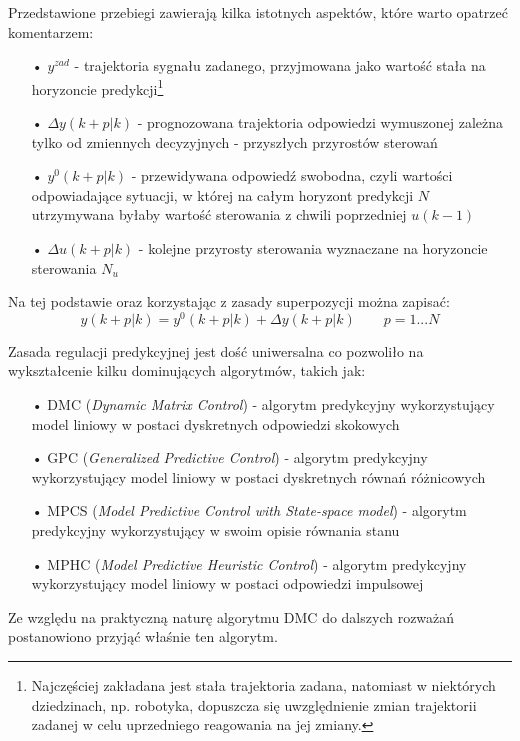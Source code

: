 Przedstawione przebiegi zawierają kilka istotnych aspektów, które warto opatrzeć komentarzem:
\begin{itemize}
\item[•] $y^{zad}$ - trajektoria sygnału zadanego, przyjmowana jako wartość stała na horyzoncie predykcji\footnote{Najczęściej zakładana jest stała trajektoria zadana, natomiast w niektórych dziedzinach, np. robotyka, dopuszcza się uwzględnienie zmian trajektorii zadanej w celu uprzedniego reagowania na jej zmiany.}
\item[•] $\Delta y(k+p|k)$ - prognozowana trajektoria odpowiedzi wymuszonej zależna tylko od zmiennych decyzyjnych - przyszłych przyrostów sterowań
\item[•] $y^0(k+p|k)$ - przewidywana odpowiedź swobodna, czyli wartości odpowiadające sytuacji, w której na całym horyzont predykcji $N$ utrzymywana byłaby wartość sterowania z chwili poprzedniej $u(k-1)$
\item[•] $\Delta u(k+p|k)$ - kolejne przyrosty sterowania wyznaczane na horyzoncie sterowania $N_u$
\end{itemize}

Na tej podstawie oraz korzystając z zasady superpozycji można zapisać:
\begin{equation}
y(k+p|k) = y^0(k+p|k) + \Delta y(k+p|k) \quad \quad p = 1 ... N
\end{equation}

\newpage

Zasada regulacji predykcyjnej jest dość uniwersalna co pozwoliło na wykształcenie kilku dominujących algorytmów, takich jak:
\begin{itemize}
\item[•] DMC (\textit{Dynamic Matrix Control}) - algorytm predykcyjny wykorzystujący model liniowy w postaci dyskretnych odpowiedzi skokowych
\item[•] GPC (\textit{Generalized Predictive Control}) - algorytm predykcyjny wykorzystujący model liniowy w postaci dyskretnych równań różnicowych
\item[•] MPCS (\textit{Model Predictive Control with State-space model}) - algorytm predykcyjny wykorzystujący w swoim opisie równania stanu
\item[•] MPHC (\textit{Model Predictive Heuristic Control}) - algorytm predykcyjny wykorzystujący model liniowy w postaci odpowiedzi impulsowej
\end{itemize}

Ze względu na praktyczną naturę algorytmu DMC do dalszych rozważań postanowiono przyjąć właśnie ten algorytm.

